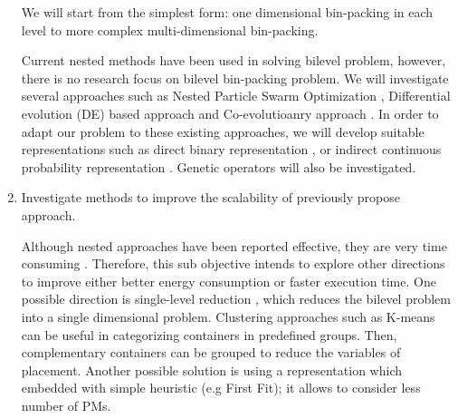 \begin{enumerate}
	 We will start from the simplest form: one dimensional bin-packing in each level to more complex multi-dimensional bin-packing.

	Current nested methods have been used in solving bilevel problem, however, there is no research focus on bilevel bin-packing problem. We will investigate several approaches such as Nested Particle Swarm Optimization \cite{Li:2006br}, Differential evolution (DE) based approach \cite{Angelo:2013ee, Zhu:2006in} and Co-evolutioanry approach \cite{Legillon:2012dd}. In order to adapt our problem to these existing approaches, we will develop suitable representations such as direct binary representation \cite{Xu:2010vh}, or indirect continuous probability representation \cite{Xiong:2014jq}. Genetic operators will also be investigated.

	\item Investigate methods to improve the scalability of previously propose approach.

	 Although nested approaches have been reported effective, they are very time consuming \cite{Sinha:2017et}. Therefore, this sub objective intends to explore other directions to improve either better energy consumption or faster execution time. One possible direction is single-level reduction \cite{Sinha:2017et}, which reduces the bilevel problem into a single dimensional problem. Clustering approaches such as K-means \cite{Xie:2011fj} can be useful in categorizing containers in predefined groups. Then, complementary containers can be grouped to reduce the variables of placement. Another possible solution is using a representation which embedded with simple heuristic (e.g First Fit); it allows to consider less number of PMs.  

\end{enumerate}

